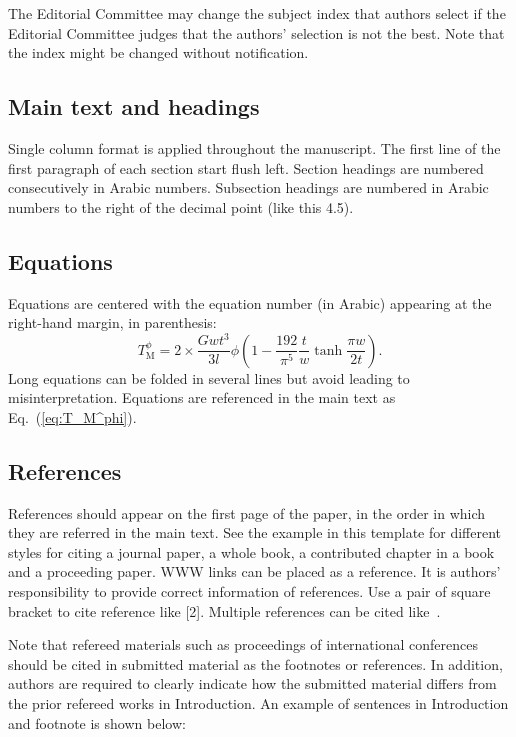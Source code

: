\documentclass{comex}
\begin{document}
The Editorial Committee may change the
subject index that authors select if the Editorial Committee judges
that the authors' selection is not the best.  Note that the index might
be changed without notification.


\subsection{Main text and headings}

Single column format is applied throughout the manuscript. The first
line of the first paragraph of each section start flush left. Section
headings are numbered consecutively in Arabic numbers. Subsection
headings are numbered in Arabic numbers to the right of the decimal
point (like this 4.5).

\subsection{Equations}

Equations are centered with the equation number (in Arabic) appearing at
the right-hand margin, in parenthesis:
\begin{equation}
T_{\mbox{M}}^{\phi} = 2 \times \frac{G w t^3}{3 l} \phi \left( 1 - \frac{192}{\pi^5} {\frac{t}{w}} \tanh \frac{\pi w}{2 t} \right).
\label{eq:T_M^phi}
\end{equation}
\noindent
%
Long equations can be folded in several lines but avoid leading to
misinterpretation. Equations are referenced in the main text as
Eq.~(\ref{eq:T_M^phi}).


\subsection{References}

References should appear on the first page of the paper, in the order in
which they are referred in the main text. See the example in this
template for different styles for citing a journal paper, a whole book,
a contributed chapter in a book and a proceeding paper. WWW links can be
placed as a reference. It is authors' responsibility to provide correct
information of references. Use a pair of square bracket to cite
reference like [2]. Multiple references can be cited like~\cite{journal_paper,chapter,book,proceeding_paper}.

Note that refereed materials such as proceedings of international conferences should be cited in 
submitted material as the footnotes or references. 
In addition, authors are required to clearly indicate how the submitted material differs from the 
prior refereed works in Introduction. 
An example of sentences in Introduction and footnote is shown below:
\end{document}
